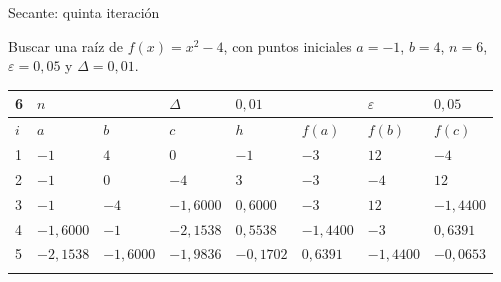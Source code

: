 \documentclass[original_version/main.tex]{subfiles}
\begin{document}
\begin{frame}[t]{Secante: quinta iteración}
\begin{minipage}[t][13mm][t]{\textwidth}\small Buscar una raíz de $f(x)=x^2-4$, con puntos iniciales $a=-1$, $b=4$, $n=6$, $\varepsilon=0{,}05$ y $\Delta=0{,}01$.\end{minipage}\par{\scriptsize\setlength{\tabcolsep}{2pt}\renewcommand{\arraystretch}{1}\begin{center}\begin{tabular}{|C{.04\textwidth}|C{.112\textwidth}|C{.112\textwidth}|C{.112\textwidth}|C{.112\textwidth}|C{.112\textwidth}|C{.112\textwidth}|C{.112\textwidth}|}
\hline
\rule{0pt}{4.3mm}6 & $n$ &  &  $\Delta$  & $0{,}01$ &  & $\varepsilon$ & $0{,}05$\\\hline
\rule{0pt}{4.3mm}$i$ & $a$ & $b$ & $c$ & $h$ & $f(a)$ & $f(b)$ & $f(c)$\\\hline
\rule{0pt}{4.3mm}1 & $-1$ & $4$ & $0$ & $-1$ & $-3$ & $12$ & $-4$\\\hline
\rule{0pt}{4.3mm}2 & $-1$ & $0$ & $-4$ & $3$ & $-3$ & $-4$ & $12$\\\hline
\rule{0pt}{4.3mm}3 & $-1$ & $-4$ & $-1{,}6000$ & $0{,}6000$ & $-3$ & $12$ & $-1{,}4400$\\\hline
\rule{0pt}{4.3mm}4 & $-1{,}6000$ & $-1$ & $-2{,}1538$ & $0{,}5538$ & $-1{,}4400$ & $-3$ & $0{,}6391$\\\hline
\rule{0pt}{4.3mm}5 & $-2{,}1538$ & $-1{,}6000$ & $-1{,}9836$ & $-0{,}1702$ & $0{,}6391$ & $-1{,}4400$ & $-0{,}0653$\\\hline
\rule{0pt}{4.3mm} &  &  &  &  &  &  & \\\hline
\end{tabular}\end{center}}\begin{minipage}[t][10mm][t]{\textwidth}\footnotesize \end{minipage}
\end{frame}
\end{document}
